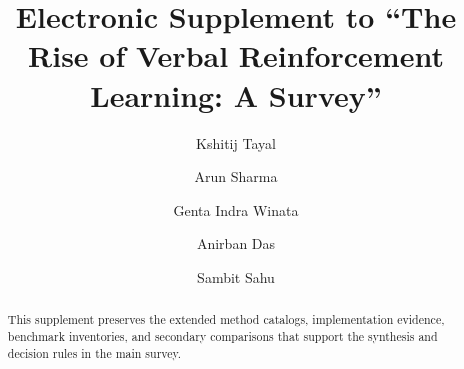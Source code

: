 \documentclass[acmsmall,screen,nonacm]{acmart}
\begin{document}
\title[VRL Survey Supplement]{Electronic Supplement to ``The Rise of Verbal Reinforcement Learning: A Survey''}
\author{Kshitij Tayal}
\author{Arun Sharma}
\author{Genta Indra Winata}
\author{Anirban Das}
\author{Sambit Sahu}
\renewcommand{\shortauthors}{Tayal et al.}
\begin{abstract}
This supplement preserves the extended method catalogs, implementation evidence, benchmark inventories, and secondary comparisons that support the synthesis and decision rules in the main survey.
\end{abstract}
\maketitle






\clearpage


\end{document}

